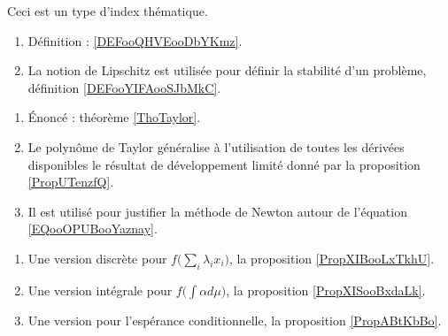 
Ceci est un type d'index thématique.


    \begin{enumerate}
    \item
        Définition : \ref{DEFooQHVEooDbYKmz}.
    \item
        La notion de Lipschitz est utilisée pour définir la stabilité d'un problème, définition \ref{DEFooYIFAooSJbMkC}.
    \end{enumerate}

    \begin{enumerate}
    \item
        Énoncé : théorème \ref{ThoTaylor}.
        \item
            Le polynôme de Taylor généralise à l'utilisation de toutes les dérivées disponibles le résultat de développement limité donné par la proposition \ref{PropUTenzfQ}.
        \item
            Il est utilisé pour justifier la méthode de Newton autour de l'équation \eqref{EQooOPUBooYaznay}.
        \end{enumerate}

    \begin{enumerate}
    \item
        Une version discrète pour \( f\big( \sum_i\lambda_ix_i \big)\), la proposition \ref{PropXIBooLxTkhU}.
    \item
        Une version intégrale pour \( f\big( \int \alpha d\mu \big)\), la proposition \ref{PropXISooBxdaLk}.
    \item
        Une version pour l'espérance conditionnelle, la proposition \ref{PropABtKbBo}.
    \end{enumerate}

